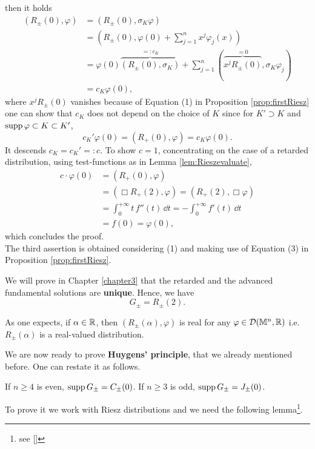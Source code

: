 then it holds
\[	\begin{aligned}
(R_\pm(0),\varphi)&=(R_\pm(0),\sigma_K\varphi)\\&=\left(R_\pm(0),\varphi(0)+\sum_{j=1}^{n}x^j\varphi_j(x)\right)\\
&=\varphi(0)\overbrace{(R_\pm(0),\sigma_K)}^{=:c_K}+\sum_{j=1}^{n}\left(\overbrace{x^jR_\pm(0)}^{=0},\sigma_K\varphi_j\right)\\
&=c_K\varphi(0),
\end{aligned}			\]
where $x^jR_\pm(0)$ vanishes because of Equation (1) in Proposition \ref{prop:firstRiesz} one can show that $c_K$ does not depend on the choice of $K$ since for $K'\supset K$ and $\text{supp}\,\varphi \subset K\subset K'$, $$c_K' \varphi (0) = (R_+ (0),\varphi) = c_K \varphi (0).$$
It descends $c_K = c_K' =: c$.  To show $c=1$, concentrating on the case of a retarded distribution, using test-functions as in Lemma \ref{lem:Rieszevaluate}, 
\[	\begin{aligned}
c\cdot\varphi(0)&=\left(R_+(0),\varphi\right)\\
&=\left(\Box R_+(2),\varphi\right)=\left( R_+(2),\Box\varphi\right)\\
&=\int_{0}^{+\infty}t\,f''(t)\,\dd t=-\int_{0}^{+\infty}f'(t)\,\dd t\\
&=f(0)=\varphi(0),
\end{aligned}		\]
which concludes the proof.\\
The third assertion is obtained considering (1) and making use of Equation (3) in Proposition \ref{prop:firstRiesz}.\endproof
\begin{rem}
	We will prove in Chapter \ref{chapter3} that the retarded and the advanced fundamental solutions are \textbf{unique}. Hence, we have
	\[	G_\pm=R_\pm(2).			\]
\end{rem}
\begin{rem}
	As one expects, if $\alpha\in{\mathbb R}$, then $(R_\pm(\alpha),\varphi)$ is real for any $\varphi\in\mathcal{D}(\mathbb{M}^n,{\mathbb R})$ i.e. $R_\pm(\alpha)$ is a real-valued distribution.
\end{rem}

\noindent We are now ready to prove \textbf{Huygens' principle}, that we already mentioned before. One can restate it as follows.

\begin{theorem}
	If $n\geq 4$ is even, $\text{supp}\,G_\pm= C_\pm(0)$.
	If $n\geq 3$ is odd, $\text{supp}\,G_\pm= J_\pm(0)$.
	\label{th:Huygens}
\end{theorem}
\noindent To prove it we work with Riesz distributions and we need the following lemma\footnote{see [\citealp[Prop. 1.3.31]{bar2}]}.

